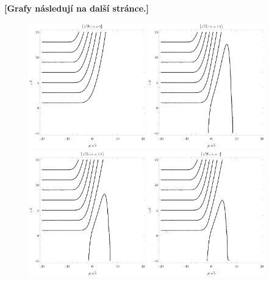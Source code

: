 \textbf{[Grafy následují na další stránce.]}




\begin{figure}[p]
    \centering
    \noindent
    \includegraphics[width=0.45\textwidth]{grafy/robin0.pdf}%
    \hspace{0.1\textwidth}%
    \includegraphics[width=0.45\textwidth]{grafy/robin0.5.pdf}%
    \\[1em]%
    \includegraphics[width=0.45\textwidth]{grafy/robin0.8.pdf}%
    \hspace{0.1\textwidth}%
    \includegraphics[width=0.45\textwidth]{grafy/robin1.pdf}%

\end{figure}
